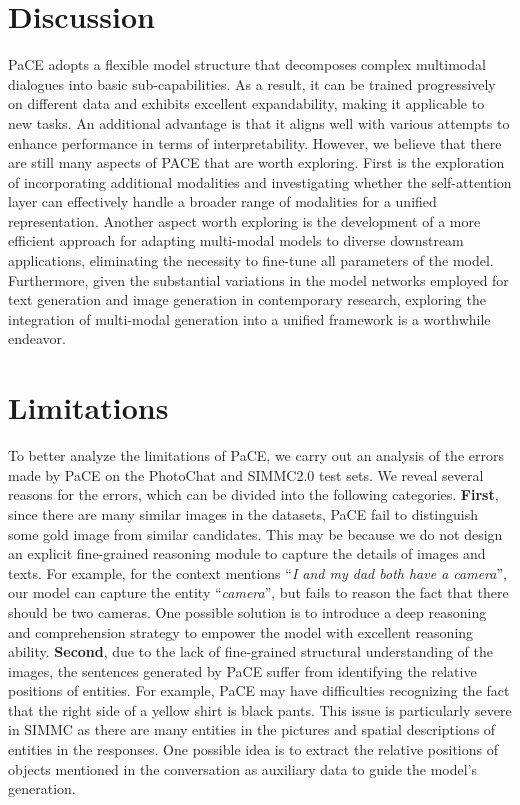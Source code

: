 \documentclass[11pt]{article}
\begin{document}
\section*{Discussion}
PaCE adopts a flexible model structure that decomposes complex multimodal dialogues into basic sub-capabilities. As a result, it can be trained progressively on different data and exhibits excellent expandability, making it applicable to new tasks. An additional advantage is that it aligns well with various attempts to enhance performance in terms of interpretability. However, we believe that there are still many aspects of PACE that are worth exploring. First is the exploration of incorporating 
additional modalities and investigating whether the self-attention layer can effectively handle a broader range of modalities for a unified representation. Another aspect worth exploring is the development of a more efficient approach for adapting multi-modal models to diverse downstream applications, eliminating the necessity to fine-tune all parameters of the model. Furthermore, given the substantial variations in the model networks employed for text generation and image generation in contemporary research, exploring the integration of multi-modal generation into a unified framework is a worthwhile endeavor.
\section*{Limitations}
To better analyze the limitations of PaCE, we carry out an analysis of the errors made by PaCE on the PhotoChat and SIMMC2.0 test sets. We reveal several reasons for the errors, which can be divided into the following categories. \textbf{First}, since there are many similar images in the datasets, PaCE  fail to distinguish some gold image from similar candidates. This may be because we do not design an explicit fine-grained reasoning module to capture the details of images and texts. For example, for the context mentions ``\textit{I and my dad both have a camera}'', our model can capture the entity ``\textit{camera}'', but fails to reason the fact that there should be two cameras. One possible solution is to introduce a  deep reasoning and comprehension strategy to empower the model with excellent reasoning ability.
\textbf{Second}, due to the lack of fine-grained structural understanding of the images, the sentences generated by PaCE suffer from identifying the relative positions of entities. For example, PaCE may have difficulties recognizing the fact that the right side of a yellow shirt is black pants. This issue is particularly severe in SIMMC as there are many entities in the pictures and spatial descriptions of entities in the responses. 
One possible idea is to extract the relative positions of objects mentioned in the conversation as auxiliary data to guide the model's generation.
\end{document}
